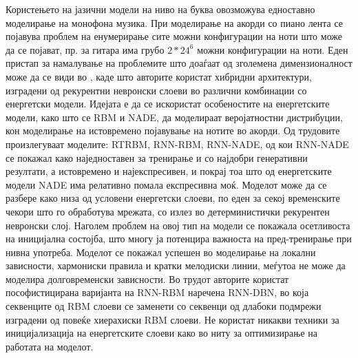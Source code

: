 Користењето на јазични модели на ниво на буква овозможува едноставно моделирање на монофона музика. При моделирање на акорди со пиано лента се појавува проблем на енумерирање сите можни конфигурации на ноти што може да се појават, пр. за гитара има грубо $2*24^6$ можни конфигурации на ноти. Еден пристап за намалување на проблемите што доаѓаат од зголемена димензионалност може да се види во \cite{Boulanger-Lewandowski2012, Boulanger-Lewandowski2014, Goel2014}, каде што авторите користат хибридни архитектури, изградени од рекурентни невронски слоеви во различни комбинации со енергетски модели. Идејата е да се искористат особеностите на енергетските модели, како што се RBM и NADE, да моделираат веројатностни дистрибуции, кон моделирање на истовремено појавување на нотите во акорди. Од трудовите \cite{Boulanger-Lewandowski2012, Boulanger-Lewandowski2014} произлегуваат моделите: RTRBM, RNN-RBM, RNN-NADE, од кои RNN-NADE се покажал како наједноставен за тренирање и со најдобри генеративни резултати, а истовремено и најекспресивен, и покрај тоа што од енергетските модели NADE има релативно помала експресивна моќ. Моделот може да се разбере како низа од условени енергетски слоеви, по еден за секој временските чекори што го обработува мрежата, со излез во детерминистички рекурентен невронски слој. Наголем проблем на овој тип на модели се покажала осетливоста на иницијална состојба, што многу ја потенцира важноста на пред-тренирање при нивна употреба. Моделот се покажал успешен во моделирање на локални зависности, хармониски правила и кратки мелодиски линии, меѓутоа не може да моделира долговременски зависности. Во трудот \cite{Goel2014} авторите користат пософистицирана варијанта на RNN-RBM наречена RNN-DBN, во која секвенците од RBM слоеви се заменети со секвенци од длабоки подмрежи изградени од повеќе хиерахиски RBM слоеви. Не користат никакви техники за иницијализација на енергетските слоеви како во \cite{Boulanger-Lewandowski2012, Boulanger-Lewandowski2014, Goel2014} ниту за оптимизирање на работата на моделот.

